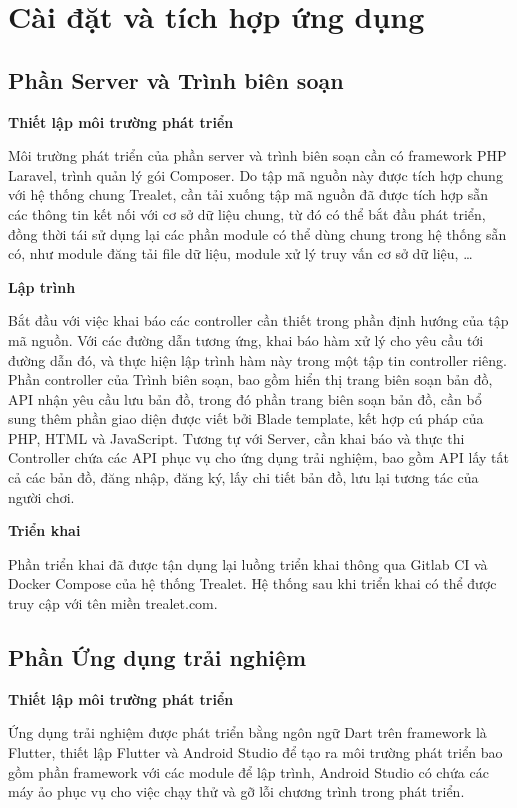\newpage
\section{Cài đặt và tích hợp ứng dụng}
\subsection{Phần Server và Trình biên soạn}
\textbf{Thiết lập môi trường phát triển}

Môi trường phát triển của phần server và trình biên soạn cần có framework PHP
Laravel, trình quản lý gói Composer. Do tập mã nguồn này được tích hợp chung với
hệ thống chung Trealet, cần tải xuống tập mã nguồn đã được tích hợp sẵn các
thông tin kết nối với cơ sở dữ liệu chung, từ đó có thể bắt đầu phát triển, đồng thời tái sử dụng lại các phần module có thể dùng chung trong hệ thống sẵn có, như module
đăng tải file dữ liệu, module xử lý truy vấn cơ sở dữ liệu, …

\textbf{Lập trình}

Bắt đầu với việc khai báo các controller cần thiết trong phần định hướng của
tập mã nguồn. Với các đường dẫn tương ứng, khai báo hàm xử lý cho yêu cầu tới
đường dẫn đó, và thực hiện lập trình hàm này trong một tập tin controller riêng. Phần
controller của Trình biên soạn, bao gồm hiển thị trang biên soạn bản đồ, API nhận
yêu cầu lưu bản đồ, trong đó phần trang biên soạn bản đồ, cần bổ sung thêm phần
giao diện được viết bởi Blade template, kết hợp cú pháp của PHP, HTML và
JavaScript.
Tương tự với Server, cần khai báo và thực thi Controller chứa các API phục
vụ cho ứng dụng trải nghiệm, bao gồm API lấy tất cả các bản đồ, đăng nhập, đăng
ký, lấy chi tiết bản đồ, lưu lại tương tác của người chơi.

\textbf{Triển khai}

Phần triển khai đã được tận dụng lại luồng triển khai thông qua Gitlab CI và
Docker Compose của hệ thống Trealet. Hệ thống sau khi triển khai có thể được truy
cập với tên miền trealet.com.

\subsection{Phần Ứng dụng trải nghiệm}

\textbf{Thiết lập môi trường phát triển}

Ứng dụng trải nghiệm được phát triển bằng ngôn ngữ Dart trên framework là
Flutter, thiết lập Flutter và Android Studio để tạo ra môi trường phát triển
bao gồm phần framework với các module để lập trình, Android Studio có chứa các
máy ảo phục vụ cho việc chạy thử và gỡ lỗi chương trình trong phát triển.


